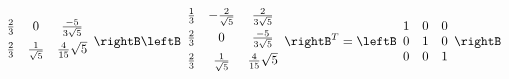 \begin{enumialphparenastyle}
\begin{ex}
\begin{sol}
\[\begin{array}{ccc}
\vspace{0.05in}\frac{2}{3} & 0 & \frac{-5}{3\sqrt{5}} \\
\vspace{0.05in}\frac{2}{3} & \frac{1}{\sqrt{5}} & \frac{4}{15}\sqrt{5}
\end{array}
\rightB \leftB
\begin{array}{ccc}
\vspace{0.05in}\frac{1}{3} & -\frac{2}{\sqrt{5}} & \frac{2}{3\sqrt{5}} \\
\vspace{0.05in}\frac{2}{3} & 0 & \frac{-5}{3\sqrt{5}} \\
\vspace{0.05in}\frac{2}{3} & \frac{1}{\sqrt{5}} & \frac{4}{15}\sqrt{5}
\end{array}
\rightB ^{T}= \leftB
\begin{array}{ccc}
1 & 0 & 0 \\
0 & 1 & 0 \\
0 & 0 & 1
\end{array}
\rightB
\]
\end{sol}
\end{ex}

\end{enumialphparenastyle}